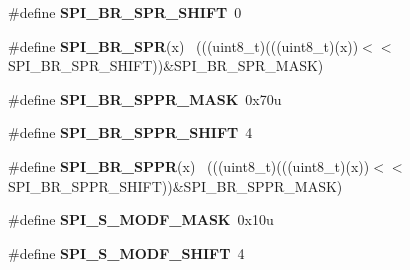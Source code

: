 \begin{DoxyCompactItemize}
\item 
\hypertarget{group___s_p_i___register___masks_ga49ebd0e5e9751438bc3968877baf2661}{}\#define {\bfseries S\+P\+I\+\_\+\+B\+R\+\_\+\+S\+P\+R\+\_\+\+S\+H\+I\+F\+T}~0\label{group___s_p_i___register___masks_ga49ebd0e5e9751438bc3968877baf2661}

\item 
\hypertarget{group___s_p_i___register___masks_ga79b87245a1a7c0f454e35ee449d6be35}{}\#define {\bfseries S\+P\+I\+\_\+\+B\+R\+\_\+\+S\+P\+R}(x)                                                    ~(((uint8\+\_\+t)(((uint8\+\_\+t)(x))$<$$<$S\+P\+I\+\_\+\+B\+R\+\_\+\+S\+P\+R\+\_\+\+S\+H\+I\+F\+T))\&S\+P\+I\+\_\+\+B\+R\+\_\+\+S\+P\+R\+\_\+\+M\+A\+S\+K)\label{group___s_p_i___register___masks_ga79b87245a1a7c0f454e35ee449d6be35}

\item 
\hypertarget{group___s_p_i___register___masks_gaf3ca4981d609aac2f31d89c677192f7a}{}\#define {\bfseries S\+P\+I\+\_\+\+B\+R\+\_\+\+S\+P\+P\+R\+\_\+\+M\+A\+S\+K}~0x70u\label{group___s_p_i___register___masks_gaf3ca4981d609aac2f31d89c677192f7a}

\item 
\hypertarget{group___s_p_i___register___masks_gac53e7d34efb934fe3232632a77301ca3}{}\#define {\bfseries S\+P\+I\+\_\+\+B\+R\+\_\+\+S\+P\+P\+R\+\_\+\+S\+H\+I\+F\+T}~4\label{group___s_p_i___register___masks_gac53e7d34efb934fe3232632a77301ca3}

\item 
\hypertarget{group___s_p_i___register___masks_gaa3474c0f016e5c6e41e6b28a80dadf1b}{}\#define {\bfseries S\+P\+I\+\_\+\+B\+R\+\_\+\+S\+P\+P\+R}(x)                                                  ~(((uint8\+\_\+t)(((uint8\+\_\+t)(x))$<$$<$S\+P\+I\+\_\+\+B\+R\+\_\+\+S\+P\+P\+R\+\_\+\+S\+H\+I\+F\+T))\&S\+P\+I\+\_\+\+B\+R\+\_\+\+S\+P\+P\+R\+\_\+\+M\+A\+S\+K)\label{group___s_p_i___register___masks_gaa3474c0f016e5c6e41e6b28a80dadf1b}

\item 
\hypertarget{group___s_p_i___register___masks_gae3b092b4e35b25cabf209f60637cb1f8}{}\#define {\bfseries S\+P\+I\+\_\+\+S\+\_\+\+M\+O\+D\+F\+\_\+\+M\+A\+S\+K}~0x10u\label{group___s_p_i___register___masks_gae3b092b4e35b25cabf209f60637cb1f8}

\item 
\hypertarget{group___s_p_i___register___masks_ga1a037c05626e7bd1f84704dd98d620b9}{}\#define {\bfseries S\+P\+I\+\_\+\+S\+\_\+\+M\+O\+D\+F\+\_\+\+S\+H\+I\+F\+T}~4\label{group___s_p_i___register___masks_ga1a037c05626e7bd1f84704dd98d620b9}


\end{DoxyCompactItemize}
